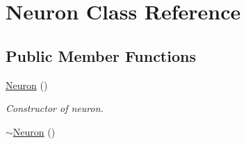 \hypertarget{classNeuron}{\section{Neuron Class Reference}
\label{classNeuron}
}
\subsection*{Public Member Functions}
\begin{DoxyCompactItemize}
\item 
\hyperlink{classNeuron_a823487d01615fadb8ac19a2768dd9d96}{Neuron} ()
\begin{DoxyCompactList}\small\item\em Constructor of neuron. \end{DoxyCompactList}\item 
\hypertarget{classNeuron_a94a250ce7e167760e593979b899745b1}{\hyperlink{classNeuron_a94a250ce7e167760e593979b899745b1}{$\sim$\-Neuron} ()}\label{classNeuron_a94a250ce7e167760e593979b899745b1}


\end{DoxyCompactItemize}

